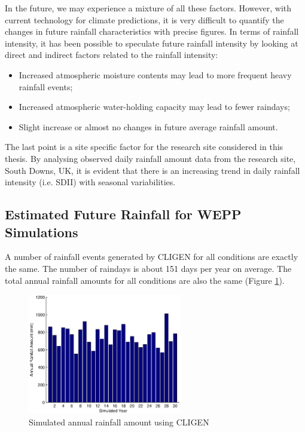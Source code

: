 In the future, we may experience a mixture of all these factors. However, with
current technology for climate predictions, it is very difficult to quantify the
changes in future rainfall characteristics with precise figures. In terms of
rainfall intensity, it has been possible to speculate future rainfall intensity
by looking at direct and indirect factors related to the rainfall intensity:
\begin{itemize}
  \item Increased atmospheric moisture contents may lead to more frequent
heavy rainfall events;
  \item Increased atmospheric water-holding capacity may lead to fewer
raindays;
  \item Slight increase or almost no changes in future average rainfall
amount.
\end{itemize}
The last point is a site specific factor for the research site considered in
this thesis. By analysing observed daily rainfall amount data from the research
site, South Downs, UK, it is evident that there is an increasing trend in daily
rainfall intensity (i.e. SDII) with seasonal variabilities.

\subsection{Estimated Future Rainfall for WEPP Simulations}
\label{sec:stimatedFutureRainfall}

A number of rainfall events generated by CLIGEN for all conditions are exactly
the same. The number of raindays is about 151 days per year on average. The
total annual rainfall amounts for all conditions are also the same (Figure
\ref{fig:annual_future_rainfall}).

\begin{figure}[htbp]
  \centering
    \includegraphics[width=0.60\textwidth]
{./img/annual_future_rainfall}
  \caption{Simulated annual rainfall amount using CLIGEN}
  \label{fig:annual_future_rainfall}
\end{figure}

